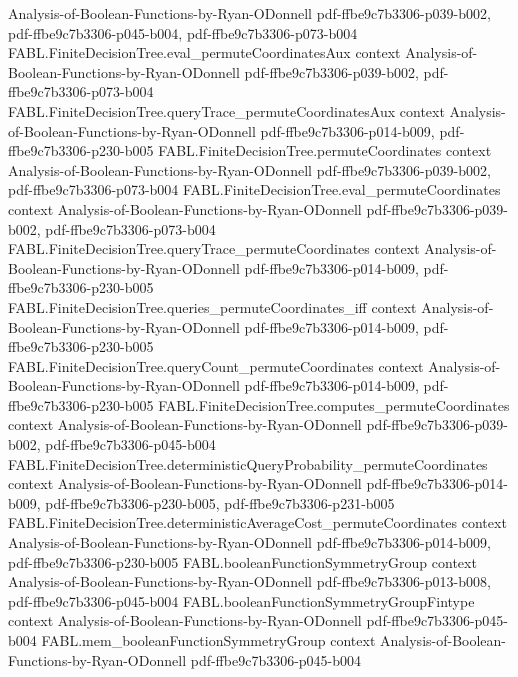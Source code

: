 \begin{theorem}
  {Analysis-of-Boolean-Functions-by-Ryan-ODonnell}
  {pdf-ffbe9c7b3306-p039-b002,
    pdf-ffbe9c7b3306-p045-b004,
    pdf-ffbe9c7b3306-p073-b004}
\proofstep
  {FABL.FiniteDecisionTree.eval_permuteCoordinatesAux}
  {context}
  {Analysis-of-Boolean-Functions-by-Ryan-ODonnell}
  {pdf-ffbe9c7b3306-p039-b002,
    pdf-ffbe9c7b3306-p073-b004}
\proofstep
  {FABL.FiniteDecisionTree.queryTrace_permuteCoordinatesAux}
  {context}
  {Analysis-of-Boolean-Functions-by-Ryan-ODonnell}
  {pdf-ffbe9c7b3306-p014-b009,
    pdf-ffbe9c7b3306-p230-b005}
\proofstep
  {FABL.FiniteDecisionTree.permuteCoordinates}
  {context}
  {Analysis-of-Boolean-Functions-by-Ryan-ODonnell}
  {pdf-ffbe9c7b3306-p039-b002,
    pdf-ffbe9c7b3306-p073-b004}
\proofstep
  {FABL.FiniteDecisionTree.eval_permuteCoordinates}
  {context}
  {Analysis-of-Boolean-Functions-by-Ryan-ODonnell}
  {pdf-ffbe9c7b3306-p039-b002,
    pdf-ffbe9c7b3306-p073-b004}
\proofstep
  {FABL.FiniteDecisionTree.queryTrace_permuteCoordinates}
  {context}
  {Analysis-of-Boolean-Functions-by-Ryan-ODonnell}
  {pdf-ffbe9c7b3306-p014-b009,
    pdf-ffbe9c7b3306-p230-b005}
\proofstep
  {FABL.FiniteDecisionTree.queries_permuteCoordinates_iff}
  {context}
  {Analysis-of-Boolean-Functions-by-Ryan-ODonnell}
  {pdf-ffbe9c7b3306-p014-b009,
    pdf-ffbe9c7b3306-p230-b005}
\proofstep
  {FABL.FiniteDecisionTree.queryCount_permuteCoordinates}
  {context}
  {Analysis-of-Boolean-Functions-by-Ryan-ODonnell}
  {pdf-ffbe9c7b3306-p014-b009,
    pdf-ffbe9c7b3306-p230-b005}
\proofstep
  {FABL.FiniteDecisionTree.computes_permuteCoordinates}
  {context}
  {Analysis-of-Boolean-Functions-by-Ryan-ODonnell}
  {pdf-ffbe9c7b3306-p039-b002,
    pdf-ffbe9c7b3306-p045-b004}
\proofstep
  {FABL.FiniteDecisionTree.deterministicQueryProbability_permuteCoordinates}
  {context}
  {Analysis-of-Boolean-Functions-by-Ryan-ODonnell}
  {pdf-ffbe9c7b3306-p014-b009,
    pdf-ffbe9c7b3306-p230-b005,
    pdf-ffbe9c7b3306-p231-b005}
\proofstep
  {FABL.FiniteDecisionTree.deterministicAverageCost_permuteCoordinates}
  {context}
  {Analysis-of-Boolean-Functions-by-Ryan-ODonnell}
  {pdf-ffbe9c7b3306-p014-b009,
    pdf-ffbe9c7b3306-p230-b005}
\proofstep
  {FABL.booleanFunctionSymmetryGroup}
  {context}
  {Analysis-of-Boolean-Functions-by-Ryan-ODonnell}
  {pdf-ffbe9c7b3306-p013-b008,
    pdf-ffbe9c7b3306-p045-b004}
\proofstep
  {FABL.booleanFunctionSymmetryGroupFintype}
  {context}
  {Analysis-of-Boolean-Functions-by-Ryan-ODonnell}
  {pdf-ffbe9c7b3306-p045-b004}
\proofstep
  {FABL.mem_booleanFunctionSymmetryGroup}
  {context}
  {Analysis-of-Boolean-Functions-by-Ryan-ODonnell}
  {pdf-ffbe9c7b3306-p045-b004}

\end{theorem}
